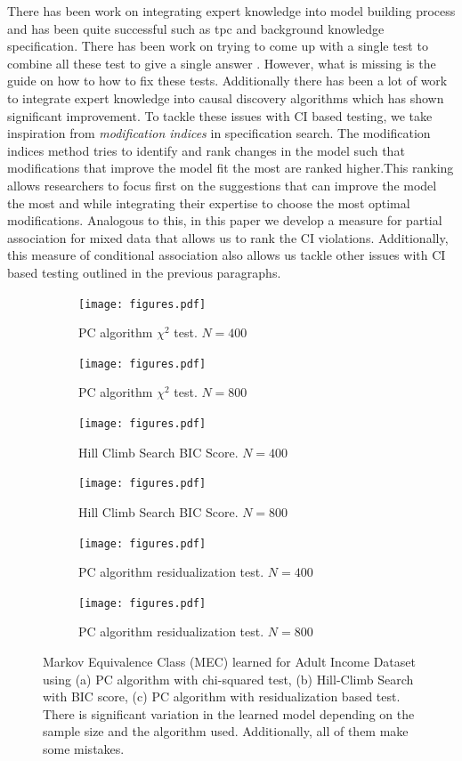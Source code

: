 \documentclass{uai2025} %
\begin{document}
There has been work on integrating expert knowledge into model building process
and has been quite successful such as tpc and background knowledge
specification. There has been work on trying to come up with a single test to
combine all these test to give a single answer \citep{Eulig2023, Shipley2000}.
However, what is missing is the guide on how to how to fix these tests.
Additionally there has been a lot of work to integrate expert knowledge into
causal discovery algorithms which has shown significant improvement. To tackle
these issues with CI based testing, we take inspiration from \emph{modification
indices} in specification search. The modification indices method tries to
identify and rank changes in the model such that modifications that improve the
model fit the most are ranked higher.This ranking allows researchers to focus
first on the suggestions that can improve the model the most and while
integrating their expertise to choose the most optimal modifications. Analogous
to this, in this paper we develop a measure for partial association for mixed
data that allows us to rank the CI violations. Additionally, this measure of
conditional association also allows us tackle other issues with CI based
testing outlined in the previous paragraphs.

\begin{figure}
\begin{subfigure}{0.25 \textwidth}
	\texttt{[image: figures.pdf]}
	\caption{PC algorithm $ \chi^2 $ test. $ N=400$ }
\end{subfigure}%
\begin{subfigure}{0.25 \textwidth}
	\texttt{[image: figures.pdf]}
	\caption{PC algorithm $ \chi^2 $ test. $ N=800$ }
\end{subfigure}
\begin{subfigure}{0.25 \textwidth}
	\texttt{[image: figures.pdf]}
	\caption{Hill Climb Search BIC Score. $ N=400$ }
\end{subfigure}%
\begin{subfigure}{0.25\textwidth}
	\texttt{[image: figures.pdf]}
	\caption{Hill Climb Search BIC Score. $ N=800$ }
\end{subfigure}
\begin{subfigure}{0.25 \textwidth}
	\texttt{[image: figures.pdf]}
	\caption{PC algorithm residualization test. $ N=400$ }
\end{subfigure}%
\begin{subfigure}{0.25\textwidth}
	\texttt{[image: figures.pdf]}
	\caption{PC algorithm residualization test. $ N=800$ }
\end{subfigure}

\caption{Markov Equivalence Class (MEC) learned for Adult Income Dataset using (a) PC algorithm with chi-squared test, (b) Hill-Climb Search with BIC score, (c) PC algorithm with residualization based test. There is significant variation in the learned model depending on the sample size and the algorithm used. Additionally, all of them make some mistakes.}
\label{fig:intro}
\end{figure}
\end{document}
